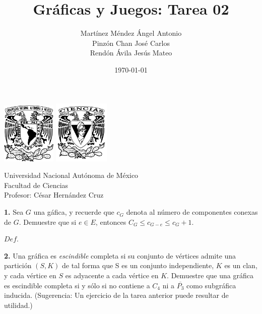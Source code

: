 \documentclass[12pt]{article}
\title{\textbf{Gráficas y Juegos: Tarea 02}}
\author{Martínez Méndez Ángel Antonio\\Pinzón Chan José Carlos\\Rendón Ávila Jesús Mateo}
\date{\today}
\begin{document}
\maketitle
\begin{center}
\vspace{3cm}
\includegraphics[width=0.195\textwidth]{Escudo.png}
\hspace{0.5cm}
\includegraphics[width=0.2\textwidth]{logo_ciencias.png}
\end{center}
\begin{center}
    \vspace{1cm}
    Universidad Nacional Autónoma de México\\
    Facultad de Ciencias\\
    Profesor: César Hernández Cruz\\
\end{center}

\newpage

%
%
\textbf{1.} Sea $G$ una gáfica, y recuerde que $c_G$ denota al número de componentes conexas de $G$.
Demuestre que si $e \in E$, entonces $C_G \leq c_{G - e} \leq c_G + 1$.\\

\begin{tcolorbox}[title=\textbf{Hipotesis}, colback=red!15!white, colframe=black!, breakable]

\end{tcolorbox}

\begin{tcolorbox}[title=\textbf{Definiciones}, colback=blue!15!white, colframe=black!, breakable]
    $Def$.
\end{tcolorbox}


\vspace{1cm}

%
%
\textbf{2.} Una gráfica es \textit{escindible} completa si su conjunto de vértices admite una partición $(S, K)$
de tal forma que S es un conjunto independiente, $K$ es un clan, y cada vértice en $S$ es
adyacente a cada vértice en $K$. Demuestre que una gráfica es escindible completa si y
sólo si no contiene a $C_4$ ni a $\overline{P_3}$ como subgráfica inducida. (Sugerencia: Un ejercicio de
la tarea anterior puede resultar de utilidad.)
\vspace{1cm}
\end{document}
